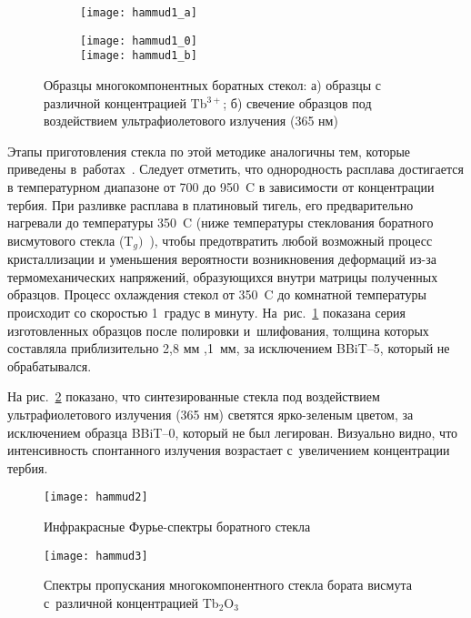 \documentclass[press]{vestnik}
\begin{document}
\begin{figure}[b!]
\centering
\begin{subfigure}{.67\textwidth}
\texttt{[image: hammud1\_a]}
\caption{}\label{fig1a}
\end{subfigure}
\begin{subfigure}{.67\textwidth}
\texttt{[image: hammud1\_0]}\\
\texttt{[image: hammud1\_b]}
\caption{}\label{fig1b}
\end{subfigure}
\caption{Образцы многокомпонентных боратных стекол: а) образцы с различной 
концентрацией Tb$^{3+}$; б) свечение образцов под воздействием 
ультрафиолетового излучения (365 нм)}
\label{fig1}
\end{figure}

Этапы приготовления стекла по этой методике аналогичны тем, которые 
приведены в~работах~\cite{B06,B07}. Следует отметить, что однородность расплава 
достигается в температурном диапазоне от 700 до 950~\textdegree C в 
зависимости от концентрации тербия. При разливке расплава в платиновый 
тигель, его предварительно нагревали до температуры 350~\textdegree C (ниже 
температуры стеклования боратного висмутового стекла (T$_{g})$~\cite{B06,B08}), чтобы 
предотвратить любой возможный процесс кристаллизации и уменьшения 
вероятности возникновения деформаций из-за термомеханических напряжений, 
образующихся внутри матрицы полученных образцов. Процесс охлаждения стекол 
от 350~\textdegree C до комнатной температуры происходит со скоростью 1~градус в минуту. На~рис.~\ref{fig1a} показана серия изготовленных образцов после 
полировки и~шлифования, толщина которых составляла приблизительно 2,8 мм 
,1~мм, за исключением BBiT--5, который не обрабатывался.

На рис.~\ref{fig1b} показано, что синтезированные стекла под воздействием 
ультрафиолетового излучения (365 нм) светятся ярко-зеленым цветом, за 
исключением образца BBiT--0, который не был легирован. Визуально видно, что 
интенсивность спонтанного излучения возрастает с~увеличением концентрации 
тербия.

\begin{figure}[b!]
\centering
\parbox{.48\textwidth}{\centering
\texttt{[image: hammud2]}
\caption{Инфракрасные Фурье-спектры боратного стекла}
\label{fig2}}
\quad
\parbox{.48\textwidth}{\centering
\texttt{[image: hammud3]}
\caption{Спектры пропускания многокомпонентного стекла бората висмута с~различной концентрацией Tb$_{2}$O$_{3}$}
\label{fig3}}
\end{figure}
\end{document}
